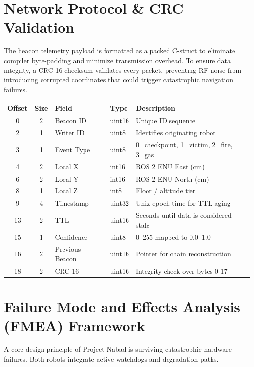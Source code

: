\documentclass[10pt, letterpaper]{article}
\begin{document}
\section{Network Protocol \& CRC Validation}

The beacon telemetry payload is formatted as a packed C-struct to eliminate compiler byte-padding and minimize transmission overhead. To ensure data integrity, a CRC-16 checksum validates every packet, preventing RF noise from introducing corrupted coordinates that could trigger catastrophic navigation failures.

\begin{center}
\footnotesize
\begin{tabularx}{\textwidth}{@{}c c l l X@{}}
\toprule
\textbf{Offset} & \textbf{Size} & \textbf{Field} & \textbf{Type} & \textbf{Description} \\
\midrule
0 & 2 & Beacon ID & uint16 & Unique ID sequence \\
2 & 1 & Writer ID & uint8 & Identifies originating robot \\
3 & 1 & Event Type & uint8 & 0=checkpoint, 1=victim, 2=fire, 3=gas \\
4 & 2 & Local X & int16 & ROS 2 ENU East (cm) \\
6 & 2 & Local Y & int16 & ROS 2 ENU North (cm) \\
8 & 1 & Local Z & int8 & Floor / altitude tier \\
9 & 4 & Timestamp & uint32 & Unix epoch time for TTL aging \\
13 & 2 & TTL & uint16 & Seconds until data is considered stale \\
15 & 1 & Confidence & uint8 & 0--255 mapped to 0.0--1.0 \\
16 & 2 & Previous Beacon & uint16 & Pointer for chain reconstruction \\
18 & 2 & CRC-16 & uint16 & Integrity check over bytes 0-17 \\
\bottomrule
\end{tabularx}
\end{center}

\section{Failure Mode and Effects Analysis (FMEA) Framework}

A core design principle of Project Nabad is surviving catastrophic hardware failures. Both robots integrate active watchdogs and degradation paths.
\end{document}
